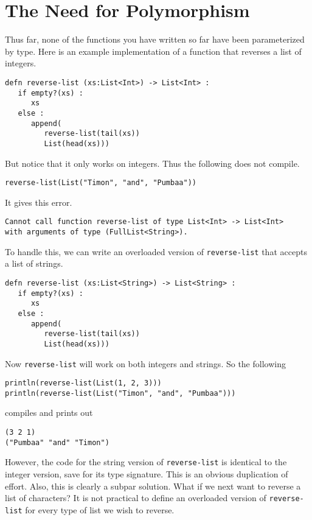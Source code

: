 \documentclass[10pt,oneside]{book}
\begin{document}
\section{The Need for Polymorphism}
Thus far, none of the functions you have written so far have been parameterized by type. Here is an example implementation of a function that reverses a list of integers.
\begin{lstlisting}
defn reverse-list (xs:List<Int>) -> List<Int> :
   if empty?(xs) :
      xs
   else :
      append(
         reverse-list(tail(xs))
         List(head(xs)))
\end{lstlisting}
But notice that it only works on integers. Thus the following does not compile.
\begin{lstlisting}
reverse-list(List("Timon", "and", "Pumbaa"))
\end{lstlisting}
It gives this error.
\begin{lstlisting}
Cannot call function reverse-list of type List<Int> -> List<Int> 
with arguments of type (FullList<String>).
\end{lstlisting}

To handle this, we can write an overloaded version of \texttt{\frenchspacing reverse-list} that accepts a list of strings.
\begin{lstlisting}
defn reverse-list (xs:List<String>) -> List<String> :
   if empty?(xs) :
      xs
   else :
      append(
         reverse-list(tail(xs))
         List(head(xs)))
\end{lstlisting}
Now \texttt{\frenchspacing reverse-list} will work on both integers and strings. So the following
\begin{lstlisting}
println(reverse-list(List(1, 2, 3)))
println(reverse-list(List("Timon", "and", "Pumbaa")))
\end{lstlisting}
compiles and prints out
\begin{lstlisting}
(3 2 1)
("Pumbaa" "and" "Timon")
\end{lstlisting}
However, the code for the string version of \texttt{\frenchspacing reverse-list} is identical to the integer version, save for its type signature. This is an obvious duplication of effort. Also, this is clearly a subpar solution. What if we next want to reverse a list of characters? It is not practical to define an overloaded version of \texttt{\frenchspacing reverse-list} for every type of list we wish to reverse.
\end{document}
